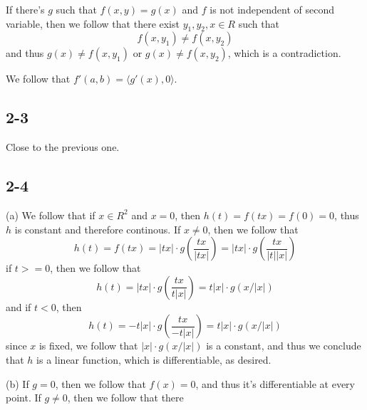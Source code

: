 \documentclass[11pt,oneside,titlepage]{book}
\newcommand{\eangle}[1]{\langle #1 \rangle}
\begin{document}
If there's $g$ such that $f(x, y) = g(x)$ and $f$ is not independent of second variable,
then we follow that there exist $y_1, y_2, x \in R$ such that
$$f(x, y_1) \neq f(x, y_2)$$
and thus $g(x) \neq f(x, y_1)$ or $g(x) \neq f(x, y_2)$, which is a contradiction.

We follow that $f'(a, b) = \eangle{g'(x), 0}$.

\subsection*{2-3}

Close to the previous one.

\subsection*{2-4}

(a) We follow that if $x \in R^2$ and $x = 0$, then $h(t) = f(tx) = f(0) = 0$, thus $h$
is constant and therefore continous. If $x \neq 0$, then we follow that
$$h(t) = f(tx) = |tx| \cdot g(\frac{tx}{|tx|}) = |tx| \cdot g(\frac{tx}{|t| |x|})$$
if $t >= 0$, then we follow that
$$h(t) = |tx| \cdot g(\frac{tx}{t |x|}) = t |x| \cdot g(x/|x|)$$
and if $t < 0$, then
$$h(t) = - t |x| \cdot g(\frac{tx}{- t|x|}) = t|x| \cdot g(x/|x|)$$
since $x$ is fixed, we follow that $|x| \cdot g(x/|x|)$ is a constant, and thus
we conclude that $h$ is a linear function, which is differentiable, as desired.

(b) If $g = 0$, then we follow that $f(x) = 0$, and thus it's differentiable at every
point. If $g \neq 0$, then we follow that there
\end{document}
